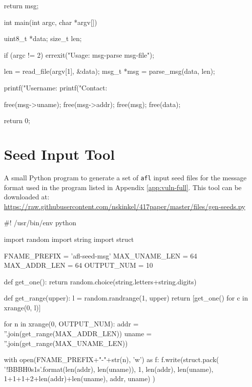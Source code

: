 \begin{appendices}
\begin{TCBlisting}[language={[ANSI]C},basicstyle=\scriptsize,caption={\mylstcaption}]
{    return msg;
}

int
main(int argc, char *argv[]) {
    uint8_t *data;
    size_t len;
    
    if (argc != 2) {
        errexit("Usage: msg-parse msg-file\n");
    }

    len = read_file(argv[1], &data);
    msg_t *msg = parse_msg(data, len);    

    printf("Username: %
    printf("Contact: %

    free(msg->uname);
    free(msg->addr);
    free(msg);
    free(data);

    return 0;
}
\end{TCBlisting}

\chapter{Seed Input Tool}
\label{app:vuln-seed}

A small Python program to generate a set of \texttt{afl} input seed files
for the message format used in the program listed in Appendix \ref{app:vuln-full}.
This tool can be downloaded at: \url{https://raw.githubusercontent.com/nskinkel/417paper/master/files/gen-seeds.py}

\renewcommand\mylstcaption{Caption goes here.}
\begin{TCBlisting}[language=Python,basicstyle=\scriptsize,caption={\mylstcaption}]
#! /usr/bin/env python

import random
import string
import struct


FNAME_PREFIX    = 'afl-seed-msg'
MAX_UNAME_LEN   = 64
MAX_ADDR_LEN    = 64
OUTPUT_NUM      = 10


def get_one():
    return random.choice(string.letters+string.digits)


def get_range(upper):
    l = random.randrange(1, upper)
    return [get_one() for c in xrange(0, l)]    
    

for n in xrange(0, OUTPUT_NUM):
    addr = ''.join(get_range(MAX_ADDR_LEN))
    uname = ''.join(get_range(MAX_UNAME_LEN))

    with open(FNAME_PREFIX+"-"+str(n), 'w') as f:
        f.write(struct.pack(
            '!BBBH{0}s{1}s'.format(len(addr), len(uname)),
            1, len(addr), len(uname),
            1+1+1+2+len(addr)+len(uname), addr, uname)
        )
\end{TCBlisting}

\end{appendices}
